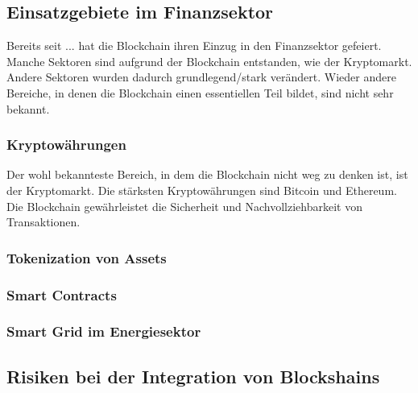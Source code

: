 \subsection{Einsatzgebiete im Finanzsektor}
Bereits seit ... hat die Blockchain ihren Einzug in den Finanzsektor gefeiert. Manche
Sektoren sind aufgrund der Blockchain entstanden, wie der Kryptomarkt. Andere Sektoren 
wurden dadurch grundlegend/stark verändert. Wieder andere Bereiche, in denen die Blockchain
einen essentiellen Teil bildet, sind nicht sehr bekannt. 

\subsubsection{Kryptowährungen}
Der wohl bekannteste Bereich, in dem die Blockchain nicht weg zu denken ist, ist der 
Kryptomarkt. Die stärksten Kryptowährungen sind Bitcoin und Ethereum. 
Die Blockchain gewährleistet die Sicherheit und Nachvollziehbarkeit von Transaktionen.

\cite[p.~168]{chowdhary2025smart}



\subsubsection{Tokenization von Assets}

\subsubsection{Smart Contracts}
\cite[p.~14]{pirafelnerblockchaintechnologie}

\subsubsection{Smart Grid im Energiesektor}
\cite[p.~72]{fill2020blockchain}


\subsection{Risiken bei der Integration von Blockshains}
\cite[p.~17]{pirafelnerblockchaintechnologie}